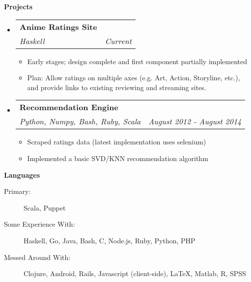\documentclass[letterpaper,11pt]{article}
\makeatletter
\newcommand{\resitem}[1]{\item #1 \vspace{-2pt}}
\newcommand{\resheading}[1]{{\large {\textbf{#1 \vphantom{p\^{E}}}}}}
\newcommand{\ressubheading}[4]{
  \begin{tabular*}{6.5in}{l@{\extracolsep{\fill}}r}
    \textbf{#1} & #2 \\
    \textit{#3} & \textit{#4} \\
  \end{tabular*}\vspace{-6pt}}
\makeatother
\begin{document}
\resheading{Projects}
\begin{itemize}
\item[]
  \ressubheading{Anime Ratings Site}{}{Haskell}{Current}
  \begin{itemize}
    \resitem{Early stages; design complete and first component partially implemented}
    \resitem{Plan: Allow ratings on multiple axes (e.g. Art, Action, Storyline, etc.), and provide links to existing reviewing and streaming sites.}
  \end{itemize}
\item[]
  \ressubheading{Recommendation Engine}{}{Python, Numpy, Bash, Ruby, Scala}{August 2012 - August 2014}
  \begin{itemize}
    \resitem{Scraped ratings data (latest implementation uses selenium)}
    \resitem{Implemented a basic SVD/KNN recommendation algorithm}
  \end{itemize}
  
\end{itemize}

\resheading{Languages}

\begin{description}
\item[Primary:]
  Scala, Puppet
\item[Some Experience With:]
  Haskell, Go, Java, Bash, C, Node.js, Ruby, Python, PHP
\item[Messed Around With:]
  Clojure, Android, Rails, Javascript (client-side), \LaTeX, Matlab, R, SPSS
\end{description}
\end{document}
